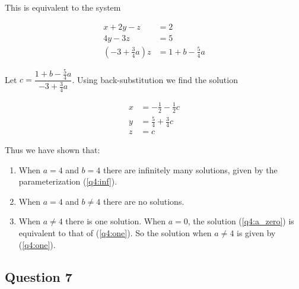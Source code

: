 \documentclass{article}
\begin{document}
This is equivalent to the system

\begin{align*}
 x + 2y - z &= 2 \\
 4y -3z &= 5 \\
 (-3 + \frac{3}{4}a)z &= 1 + b - \frac{5}{4}a
\end{align*}

Let $c = \dfrac{1 + b - \frac{5}{4}a}{-3 + \frac{3}{4}a}$.  Using back-substitution we find the solution

\begin{equation}\begin{aligned}
 x &= -\frac{1}{2} - \frac{1}{2}c \\
 y &= \frac{5}{4} + \frac{3}{4}c \\
 z &= c
\end{aligned}\label{q4:one}\end{equation}

Thus we have shown that:
\begin{enumerate}
\item When $a = 4$ and $b = 4$ there are infinitely many solutions, given
by the parameterization (\ref{q4:inf}).
\item When $a = 4$ and $b \neq 4$ there are no solutions.
\item When $a \neq 4$ there is one solution.  When $a = 0$, the 
solution (\ref{q4:a_zero}) is equivalent to that of (\ref{q4:one}).  
So the solution when $a \neq 4$ is given by (\ref{q4:one}).
\end{enumerate}

\subsection*{Question 7}
\end{document}
